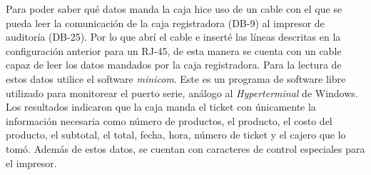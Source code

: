 \begin{table}

\begin{center}
 \caption{Configuración RJ-45 a DB-9 para DIGI}
 \label{tab:digi}
\end{center}
 
\end{table}


Para poder saber qué datos manda la caja hice uso de un cable con el que se pueda leer la comunicación de la caja registradora (DB-9) al impresor de auditoría (DB-25). Por lo que abrí el cable e inserté las líneas descritas en la configuración anterior para un RJ-45, de esta manera se cuenta con un cable capaz de leer los datos mandados por la caja registradora. Para la lectura de estos datos utilice el software \textit{minicom}. Este es un programa de software libre utilizado para monitorear el puerto serie, análogo al \textit{Hyperterminal} de Windows. Los resultados indicaron que la caja manda el ticket con únicamente la información necesaria como número de productos, el producto, el costo del producto, el subtotal, el total, fecha, hora, número de ticket y el cajero que lo tomó. Además de estos datos, se cuentan con caracteres de control especiales para el impresor.

